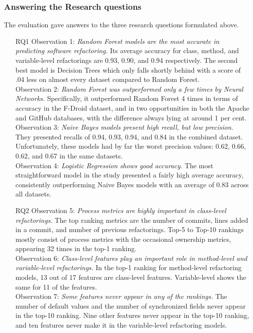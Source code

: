 \subsubsection{Answering the Research questions}
The evaluation gave answers to the three research questions formulated above. 
\begin{itemize}
    \item[RQ1] Observation 1: \textit{Random Forest models are the most accurate in predicting software refactoring.} Its average accuracy for class, method, and variable-level refactorings are 0.93, 0.90, and 0.94 respectively. The second best model is Decision Trees which only falls shortly behind with a score of .04 less on almost every dataset compared to Random Forest.\\Observation 2: \textit{Random Forest was outperformed only a few times by Neural Networks.} Specifically, it outperformed Random Forest 4 times in terms of accuracy in the F-Droid dataset, and in two opportunities in both the Apache and GitHub databases, with the difference always lying at around 1 per cent. \\ Observation 3: \textit{Naive Bayes models present high recall, but low precision.} They presented recalls of 0.94, 0.93, 0.94, and 0.84 in the combined dataset. Unfortunately, these models had by far the worst precision values: 0.62, 0.66, 0.62, and 0.67 in the same datasets. \\ Observation 4: \textit{Logistic Regression shows good accuracy.} The most straightforward model in the study presented a fairly high average accuracy, consistently outperforming Naive Bayes models with an average of 0.83 across all datasets. 
    \item[RQ2] Observation 5: \textit{Process metrics are highly important in class-level refactorings.} The top ranking metrics are the number of commits, lines added in a commit, and number of previous refactorings. Top-5 to Top-10 rankings mostly consist of process metrics with the occasional ownership metrics, appearing 32 times in the top-1 ranking. \\ Observation 6: \textit{Class-level features play an important role in method-level and variable-level refactorings.} In the top-1 ranking for method-level refactoring models, 13 out of 17 features are class-level features. Variable-level shows the same for 11 of the features. \\ Observation 7: \textit{Some features never appear in any of the rankings.} The number of default values and the number of synchronized fields never appear in the top-10 ranking. Nine other features never appear in the top-10 ranking, and ten features never make it in the variable-level refactoring models.

\end{itemize}
